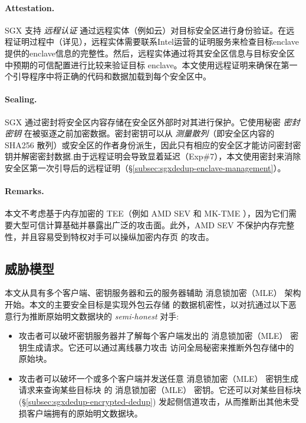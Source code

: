 \paragraph*{Attestation.} SGX 支持 \textit{ 远程认证} 通过远程实体（例如云）对目标安全区进行身份验证。在远程证明过程中（详见\cite{sgx}），远程实体需要联系Intel运营的证明服务来检查目标enclave提供的enclave信息的完整性。然后，远程实体通过将其安全区信息与目标安全区中预期的可信配置进行比较来验证目标 enclave。本文使用远程证明来确保在第一个引导程序中将正确的代码和数据加载到每个安全区中。

\paragraph*{Sealing.} SGX 通过密封将安全区内容存储在安全区外部时对其进行保护。它使用秘密 \textit{ 密封密钥} 在被驱逐之前加密数据。密封密钥可以从 \textit{ 测量散列}（即安全区内容的 SHA256 散列）或安全区的作者身份派生，因此只有相应的安全区才能访问密封密钥并解密密封数据.由于远程证明会导致显着延迟（Exp\#7），本文使用密封来消除安全区第一次引导后的远程证明（\S\ref{subsec:sgxdedup-enclave-management}）。

\paragraph*{Remarks.} 本文不考虑基于内存加密的 TEE（例如 AMD SEV \cite{AMDSEV} 和 MK-TME \cite{MK-TME}），因为它们需要大型可信计算基础并暴露出广泛的攻击面\cite{mofrad18}。此外，AMD SEV \cite{AMDSEV} 不保护内存完整性，并且容易受到特权对手可以操纵加密内存页 \cite{mofrad18} 的攻击。

\subsection{威胁模型}
\label{subsec:sgxdedup-threat}

 本文从具有多个客户端、密钥服务器和云的服务器辅助 消息锁加密（MLE） 架构 \cite{bellare2013DupLESS} 开始。本文的主要安全目标是实现外包云存储 \cite{bellare2013DupLESS} 的数据机密性，以对抗通过以下恶意行为推断原始明文数据块的 \textit{ semi-honest} 对手:

\begin{itemize}[leftmargin=*]
\item 攻击者可以破坏密钥服务器并了解每个客户端发出的 消息锁加密（MLE） 密钥生成请求。它还可以通过离线暴力攻击 \cite{bellare2013DupLESS} 访问全局秘密来推断外包存储中的原始块。
    \item 攻击者可以破坏一个或多个客户端并发送任意 消息锁加密（MLE） 密钥生成请求来查询某些目标块 \cite{bellare2013DupLESS} 的 消息锁加密（MLE） 密钥。它还可以对某些目标块 \cite{harnik2010side} (\S\ref{subsec:sgxdedup-encrypted-dedup}) 发起侧信道攻击，从而推断出其他未受损客户端拥有的原始明文数据块。
\end{itemize}

